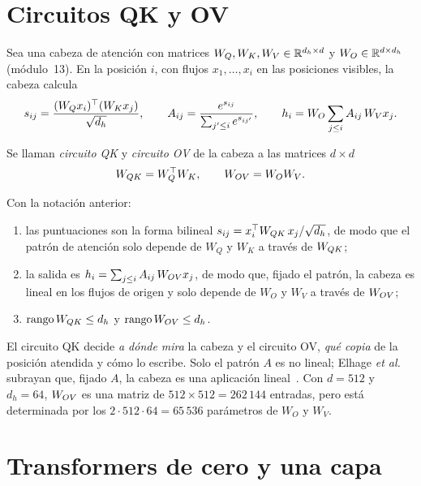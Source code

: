 \section{Circuitos QK y OV}

Sea una cabeza de atención con matrices $W_Q,W_K,W_V\in\mathbb{R}^{d_h\times d}$ y $W_O\in\mathbb{R}^{d\times d_h}$ (módulo~13). En la posición $i$, con flujos $x_1,\dots,x_i$ en las posiciones visibles, la cabeza calcula
\[
s_{ij}=\frac{(W_Qx_i)^{\top}(W_Kx_j)}{\sqrt{d_h}},\qquad A_{ij}=\frac{e^{s_{ij}}}{\sum_{j'\le i}e^{s_{ij'}}},\qquad h_i=W_O\sum_{j\le i}A_{ij}\,W_Vx_j.
\]

\begin{definicion}[Circuitos QK y OV]\label{def:qkov}
Se llaman \emph{circuito QK} y \emph{circuito OV} de la cabeza a las matrices $d\times d$
\[
W_{QK}=W_Q^{\top} W_K,\qquad W_{OV}=W_OW_V.
\]
\end{definicion}

\begin{proposicion}\label{prop:qkov}
Con la notación anterior:
\begin{enumerate}
  \item las puntuaciones son la forma bilineal $s_{ij}=x_i^{\top}W_{QK}\,x_j/\sqrt{d_h}$, de modo que el patrón de atención solo depende de $W_Q$ y $W_K$ a través de $W_{QK}$;
  \item la salida es $h_i=\sum_{j\le i}A_{ij}\,W_{OV} x_j$, de modo que, fijado el patrón, la cabeza es lineal en los flujos de origen y solo depende de $W_O$ y $W_V$ a través de $W_{OV}$;
  \item $\operatorname{rango}W_{QK}\le d_h$ y $\operatorname{rango}W_{OV}\le d_h$.
\end{enumerate}
\end{proposicion}

El circuito QK decide \emph{a dónde mira} la cabeza y el circuito OV, \emph{qué copia} de la posición atendida y cómo lo escribe. Solo el patrón $A$ es no lineal; Elhage \emph{et al.} subrayan que, fijado $A$, la cabeza es una aplicación lineal~\cite[«Splitting Attention Head terms into Query-Key and Output-Value Circuits»]{elhage21}. Con $d=512$ y $d_h=64$, $W_{OV}$ es una matriz de $512\times 512=262\,144$ entradas, pero está determinada por los $2\cdot 512\cdot 64=65\,536$ parámetros de $W_O$ y $W_V$.

\section{Transformers de cero y una capa}

